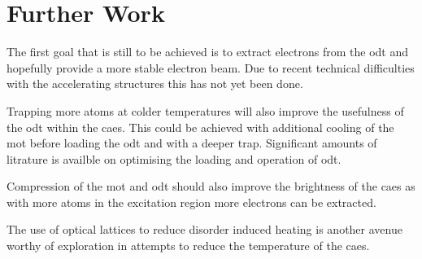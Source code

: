 \section{Further Work}

The first goal that is still to be achieved is to extract electrons from the \gls{odt} and hopefully provide a more stable electron beam. Due to recent technical difficulties with the accelerating structures this has not yet been done.

Trapping more atoms at colder temperatures will also improve the usefulness of the \gls{odt} within the \gls{caes}. This could be achieved with additional cooling of the \gls{mot} before loading the \gls{odt} and with a deeper trap. Significant amounts of litrature is availble on optimising the loading and operation of \gls{odt}.

Compression of the \gls{mot} and \gls{odt} should also improve the brightness of the \gls{caes} as with more atoms in the excitation region more electrons can be extracted.

The use of optical lattices to reduce disorder induced heating is another avenue worthy of exploration in attempts to reduce the temperature of the \gls{caes}.
